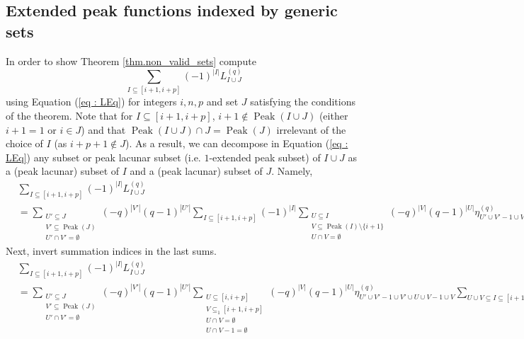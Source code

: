 \documentclass[submission]{FPSAC2023}
\newcommand{\Peak}{\operatorname{Peak}}
\begin{document}
\subsection{Extended peak functions indexed by generic sets}
\label{section.non_valid_sets}
In order to show Theorem \ref{thm.non_valid_sets} compute
\begin{equation*}
\sum_{I \subseteq [i+1, i+p]}(-1)^{|I|}L^{(q)}_{I \cup J}
\end{equation*}
using Equation (\ref{eq : LEq}) for integers $i, n, p$ and set $J$ satisfying the conditions of the theorem. Note that for $I \subseteq [i+1, i+p]$, $i+1 \notin \Peak(I \cup J)$ (either $i+1 = 1$ or $i \in J$) and that $\Peak(I \cup J) \cap J = \Peak(J)$ irrelevant of the choice of $I$ (as $i+p+1 \notin J$). As a result, we can decompose in Equation (\ref{eq : LEq}) any subset or peak lacunar subset (i.e. $1$-extended peak subset) of $I\cup J$ as a (peak lacunar) subset of $I$ and a (peak lacunar) subset of $J$. Namely,
\begin{align*}
&\sum_{I \subseteq [i+1, i+p]}(-1)^{|I|}L^{(q)}_{I \cup J} \\
&=  \sum_{\substack{U' \subseteq J\\ V' \subseteq \Peak(J) \\ U'\cap V' = \emptyset}}\!\!\!\!\!\!\!(-q)^{|V'|}(q-1)^{|U'|}\!\!\!\!\!\sum_{I \subseteq [i+1, i+p]}(-1)^{|I|}\!\!\!\!\!\!\!\!\!\!\!\!\sum_{\substack{U \subseteq I\\ V \subseteq \Peak(I)\setminus \{i+1\} \\ U\cap V = \emptyset}}\!\!\!\!\!\!\!\!\!\!\!(-q)^{|V|}(q-1)^{|U|}\eta^{(q)}_{U' \cup V'-1 \cup V' \cup U \cup V-1 \cup V}.
\end{align*}
Next, invert summation indices in the last sums.
\begin{align*}
&\sum_{I \subseteq [i+1, i+p]}(-1)^{|I|}L^{(q)}_{I \cup J} \\
&=  \sum_{\substack{U' \subseteq J\\ V' \subseteq \Peak(J) \\ U'\cap V' = \emptyset}}\!\!\!\!\!\!\!(-q)^{|V'|}(q-1)^{|U'|}\!\!\!\!\!\sum_{\substack{U \subseteq [i, i+p]\\ V \subseteq_1 [i+1, i+p] \\ U\cap V = \emptyset\\ U\cap V-1 = \emptyset}}\!\!\!\!\!\!\!\!(-q)^{|V|}(q-1)^{|U|}\eta^{(q)}_{U' \cup V'-1 \cup V' \cup U \cup V-1 \cup V}\!\!\!\!\!\!\!\!\!\!\!\!\!\!\!\!\!
\sum_{U \cup V \subseteq I \subseteq [i+1, i+p] \setminus V-1}\!\!\!\!\!\!\!\!\!\!\!\!\!\!\!\!\!(-1)^{|I|}.
\end{align*}
\end{document}
